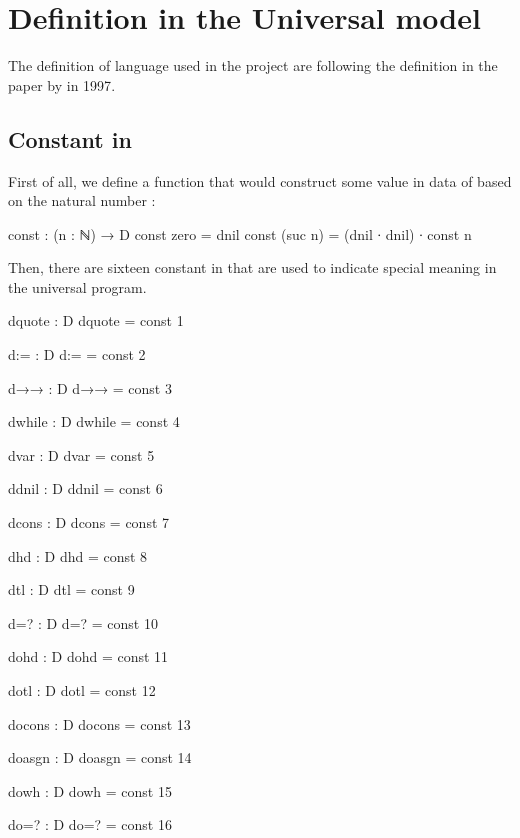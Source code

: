 \chapter{Definition in the Universal \WHILE model}
The definition of \WHILE language used in the project are following the definition in the paper  by  in 1997\cite{jones_computability_1997}.
\section{Constant in \WHILE}\label{appendix:const of d}
First of all, we define a function that would construct some value in data of  based on the natural number :
\begin{code}
const : (n : ℕ) → D
const zero = dnil
const (suc n) = (dnil ∙ dnil) ∙ const n
\end{code}
Then, there are sixteen constant in  that are used to indicate special meaning in the universal \WHILE program.
\begin{code}[fontsize=\footnotesize]
dquote : D
dquote = const 1

d:= : D
d:= = const 2

d→→ : D
d→→ = const 3

dwhile : D
dwhile = const 4

dvar : D
dvar =  const 5

ddnil : D
ddnil = const 6

dcons : D
dcons = const 7

dhd : D
dhd = const 8

dtl : D
dtl = const 9

d=? : D
d=? = const 10

dohd : D
dohd = const 11

dotl : D
dotl = const 12

docons : D
docons = const 13

doasgn : D
doasgn = const 14

dowh : D
dowh = const 15

do=? : D
do=? = const 16
\end{code}
